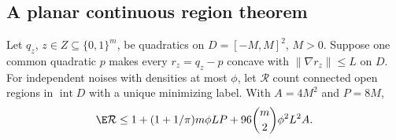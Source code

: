 \subsection{A planar continuous region theorem}
\begin{theorem}\label{thm:planar}
Let $q_z$, $z\in Z\subseteq\{0,1\}^m$, be quadratics on
$D=[-M,M]^2$, $M>0$. Suppose one common quadratic $p$ makes every
$r_z=q_z-p$ concave with $\|\nabla r_z\|\le L$ on $D$.
For independent noises with densities at most $\phi$, let $\mathcal R$
count connected open regions in $\operatorname{int}D$ with a unique
minimizing label. With $A=4M^2$ and $P=8M$,
\begin{equation}\label{eq:planar}
 \E\mathcal R\le1+(1+1/\pi)m\phi LP
                  +96\binom{m}{2}\phi^2L^2A.
\end{equation}
\end{theorem}
